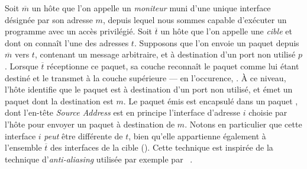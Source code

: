% 
% 
% 

Soit $\overline{m}$ un hôte que l'on appelle un {\em moniteur} muni d'une unique
interface désignée par son adresse \ip $m$, depuis lequel nous sommes capable
d'exécuter un programme avec un accès privilégié. Soit $\overline{t}$ un hôte
que l'on appelle une {\em cible} et dont on connaît l'une des adresses \ip $t$.
Supposons que l'on envoie un paquet \udp depuis $\overline{m}$ vers $t$,
contenant un message arbitraire, et à destination d'un port non utilisé $p$.
Lorsque $\overline{t}$ réceptionne ce paquet, sa couche \LLL reconnaît le paquet
comme lui étant destiné et le transmet à la couche supérieure --- en
l'occurence, \udp.
À ce niveau, l'hôte identifie que le paquet est à destination d'un port non
utilisé, et émet un paquet  dont la destination est $m$\cite{rfc1122,rfc1123}. Le paquet \icmp
émis est encapsulé dans un paquet \ip, dont l'en-tête {\em Source Address} est
en principe l'interface d'adresse \ip $i$ choisie par l'hôte pour envoyer un
paquet à destination de $m$. Notons en particulier que cette interface $i$ {\em
peut} être différente de $t$, bien qu'elle appartienne également à l'ensemble
$\overline{t}$ des interfaces de la cible ().
Cette technique est inspirée de la technique d'{\em anti-aliasing} utilisée par
exemple par \iffinder~\cite{keysiffinder,iffinder,280555,GovindanT00}.

